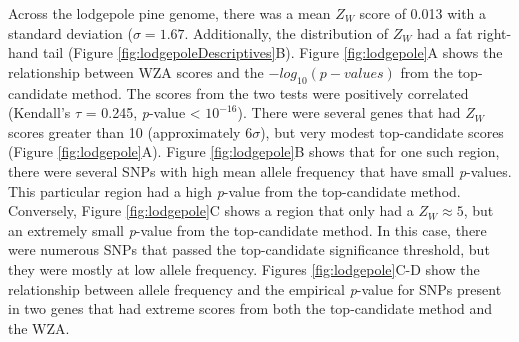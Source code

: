 \documentclass[10pt,twoside,lineno]{GSA_format}
\begin{document}
Across the lodgepole pine genome, there was a mean $Z_W$ score of 0.013 with a standard deviation ($\sigma = 1.67$. Additionally, the distribution of $Z_W$ had a fat right-hand tail (Figure \ref{fig:lodgepoleDescriptives}B). Figure \ref{fig:lodgepole}A shows the relationship between WZA scores and the $-log_{10}(p-values)$ from the top-candidate method. The scores from the two tests were positively correlated (Kendall's $\tau$ = 0.245, \textit{p}-value < $10^{-16}$). There were several genes that had $Z_W$ scores greater than 10 (approximately $6\sigma$), but very modest top-candidate scores (Figure \ref{fig:lodgepole}A). Figure \ref{fig:lodgepole}B shows that for one such region, there were several SNPs with high mean allele frequency that have small \textit{p}-values. This particular region had a high \textit{p}-value from the top-candidate method. Conversely, Figure \ref{fig:lodgepole}C shows a region that only had a $Z_W\approx5$, but an extremely small \textit{p}-value from the top-candidate method. In this case, there were numerous SNPs that passed the top-candidate significance threshold, but they were mostly at low allele frequency. Figures \ref{fig:lodgepole}C-D show the relationship between allele frequency and the empirical \textit{p}-value for SNPs present in two genes that had extreme scores from both the top-candidate method and the WZA.
\end{document}
